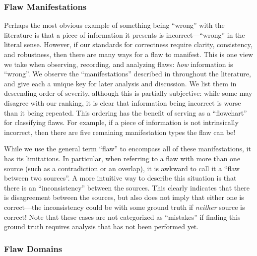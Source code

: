 \subsubsection{Flaw Manifestations}\label{mnfst-def}

Perhaps the most obvious example of something being ``wrong'' with the
literature is that a piece of information it presents is incorrect---``wrong''
in the literal sense. However, if our standards for correctness require
clarity, consistency, and robustness, then there are many ways for a flaw to
manifest. This is one view we take when observing, recording, and analyzing
flaws: \emph{how} information is ``wrong''. We observe the
``manifestations'' described in  throughout the
literature, and give each a unique key for later analysis and discussion. We
list them in descending order of severity, although this is partially
subjective: while some may disagree with our ranking, it is clear that
information being incorrect is worse than it being repeated. This ordering has
the benefit of serving as a ``flowchart'' for classifying flaws. For example,
if a piece of information is not intrinsically incorrect, then there are five
remaining manifestation types the flaw can be!



While we use the general term ``flaw'' to encompass all of these
manifestations, it has its limitations. In particular, when referring to a flaw
with more than one source (such as a contradiction or an overlap), it is
awkward to call it a ``flaw between two sources''. A more
intuitive way to describe this situation is that there is an ``inconsistency''
between the sources. This clearly indicates that there is disagreement between
the sources, but also does not imply that either one is correct---the
inconsistency could be with some ground truth
if \emph{neither} source is correct! Note that these
cases are not categorized as ``mistakes'' if finding this ground truth requires
analysis that has not been performed yet.

\ifnotpaper \newpage \fi

\subsubsection{Flaw Domains}\label{dmn-def}

